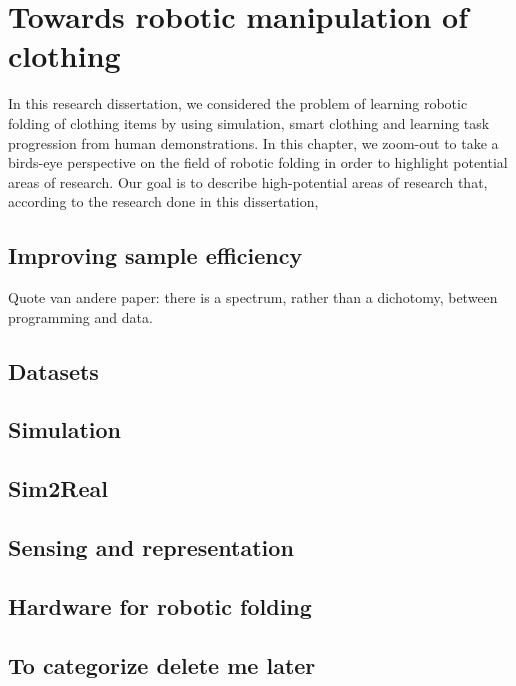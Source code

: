 \documentclass[\home/main.tex]{subfiles}
\begin{document}

\chapter{Towards robotic manipulation of clothing}\label{ch:towards_robotic_folding}

In this research dissertation, we considered the problem of learning robotic folding of clothing items by using simulation, smart clothing and learning task progression from human demonstrations. In this chapter, we zoom-out to take a birds-eye perspective on the field of robotic folding in order to highlight potential areas of research. Our goal is to describe high-potential areas of research that, according to the research done in this dissertation, 

\section{Improving sample efficiency}



Quote van andere paper: there is a spectrum, rather than a dichotomy, between programming and data.

\section{Datasets}

\section{Simulation}

\section{Sim2Real}

\section{Sensing and representation}

\section{Hardware for robotic folding}

\section{To categorize delete me later}
\end{document}
